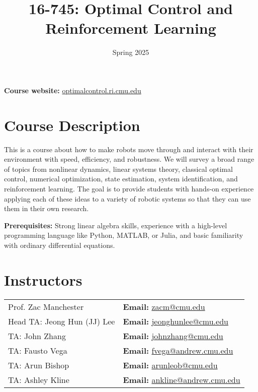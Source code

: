 \documentclass[11pt,letterpaper]{article}
\title{16-745: Optimal Control and Reinforcement Learning}
\author{Spring 2025}
\date{}
\begin{document}
\maketitle

\noindent 
\textbf{Course website:} \href{https://optimalcontrol.ri.cmu.edu/}{optimalcontrol.ri.cmu.edu}

\section*{Course Description}

This is a course about how to make robots move through and interact with their environment with speed, efficiency, and robustness. We will survey a broad range of topics from nonlinear dynamics, linear systems theory, classical optimal control, numerical optimization, state estimation, system identification, and reinforcement learning. The goal is to provide students with hands-on experience applying each of these ideas to a variety of robotic systems so that they can use them in their own research.



\medskip
\noindent
\textbf{Prerequisites:} Strong linear algebra skills, experience with a high-level programming language like Python, MATLAB, or Julia, and basic familiarity with ordinary differential equations.

\section*{Instructors}

\begin{center}
\begin{tabular}{l l}
	Prof. Zac Manchester & \textbf{Email:} \href{mailto:zacm@cmu.edu}{zacm@cmu.edu} \\
	Head TA: Jeong Hun (JJ) Lee & \textbf{Email:} \href{mailto:jeonghunlee@cmu.edu}{jeonghunlee@cmu.edu}
	\\
	TA: John Zhang & \textbf{Email:} \href{mailto:johnzhang@cmu.edu}{johnzhang@cmu.edu}
	\\
	TA: Fausto Vega & \textbf{Email:} \href{mailto:fvega@andrew.cmu.edu}{fvega@andrew.cmu.edu}
	\\
 TA: Arun Bishop & \textbf{Email:} \href{mailto:arunleob@cmu.edu}{arunleob@cmu.edu}
 \\
	TA: Ashley Kline & \textbf{Email:} \href{mailto:ankline@andrew.cmu.edu}{ankline@andrew.cmu.edu}
\end{tabular}
\end{center}
\end{document}
